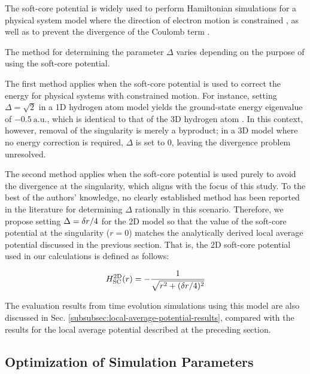 \documentclass[jctc-draft.tex]{subfiles}
\begin{document}
The soft-core potential is widely used to perform Hamiltonian simulations for a
physical system model where the direction of electron motion is constrained
\cite{Hall2009.PhysRevA.80.032507, Fernandez_1991,
LiChen2021.doi:10.1021/acs.jpca.1c00698}, as well as to prevent the divergence
of the Coulomb term \cite{Childs2022quantumsimulationof}.

The method for determining the parameter $\Delta$ varies depending on the
purpose of using the soft-core potential.

The first method applies when the soft-core potential is used to correct the
energy for physical systems with constrained motion. For instance, setting
$\Delta=\sqrt{2}$ in a 1D hydrogen atom model yields the ground-state energy
eigenvalue of $-0.5\ \mathrm{a.u.}$, which is identical to that of the 3D
hydrogen atom \cite{Eberly1991.PhysRevA.44.5997}. In this context, however,
removal of the singularity is merely a byproduct; in a 3D model where no energy
correction is required, $\Delta$ is set to $0$, leaving the divergence problem
unresolved.

The second method applies when the soft-core potential is used purely to avoid
the divergence at the singularity, which aligns with the focus of this study. To
the best of the authors' knowledge, no clearly established method has been
reported in the literature for determining $\Delta$ rationally in this scenario.
Therefore, we propose setting $\Delta = \delta r/4$ for the 2D model so that the
value of the soft-core potential at the singularity ($r=0$) matches the
analytically derived local average potential discussed in the previous section.
That is, the 2D soft-core potential used in our calculations is defined as
follows:

\begin{equation}
H_{\mathrm{SC}}^{\mathrm{2D}}(r) = - \frac{1}{\sqrt{r^2+(\delta r/4)^2}}
\label{eq:Hsc2r-fixed}
\end{equation}

The evaluation results from time evolution simulations using this model are also
discussed in Sec. \ref{subsubsec:local-average-potential-results}, compared with
the results for the local average potential described at the preceding section.

\subsection{Optimization of Simulation Parameters}
\label{subsec:optimization-of-simulation-parameters}
\end{document}
